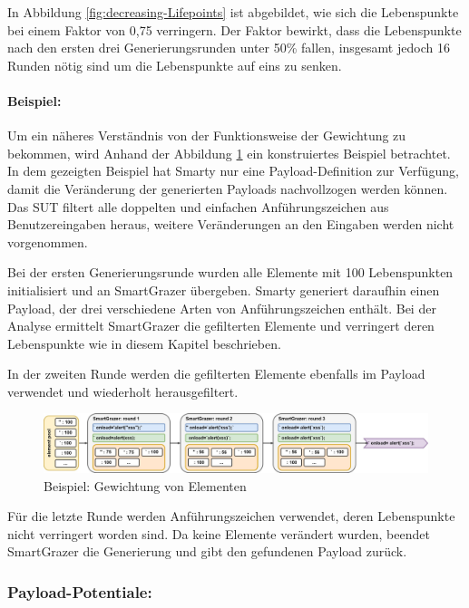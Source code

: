In Abbildung \ref{fig:decreasing-Lifepoints} ist abgebildet, wie sich die Lebenspunkte bei einem Faktor von 0,75 verringern. Der Faktor bewirkt, dass die Lebenspunkte nach den ersten drei Generierungsrunden unter 50\% fallen, insgesamt jedoch 16 Runden nötig sind um die Lebenspunkte auf eins zu senken.

\FloatBarrier

\paragraph{Beispiel:} Um ein näheres Verständnis von der Funktionsweise der Gewichtung zu bekommen, wird Anhand der Abbildung \ref{fig:SmartGrazer-adjustmentExample} ein konstruiertes Beispiel betrachtet. In dem gezeigten Beispiel hat Smarty nur eine Payload-Definition zur Verfügung, damit die Veränderung der generierten Payloads nachvollzogen werden können. Das \ac{SUT} filtert alle doppelten und einfachen Anführungszeichen aus Benutzereingaben heraus, weitere Veränderungen an den Eingaben werden nicht vorgenommen.

Bei der ersten Generierungsrunde wurden alle Elemente mit 100 Lebenspunkten initialisiert und an SmartGrazer übergeben. Smarty generiert daraufhin einen Payload, der drei verschiedene Arten von Anführungszeichen enthält. Bei der Analyse ermittelt SmartGrazer die gefilterten Elemente und verringert deren Lebenspunkte wie in diesem Kapitel beschrieben.

In der zweiten Runde werden die gefilterten Elemente ebenfalls im Payload verwendet und wiederholt herausgefiltert.

\begin{figure}[htbp] 
	\centering
	\includegraphics[width=\textwidth]{contents/images/SmartGrazerAdjustmentExample}
	\caption{Beispiel: Gewichtung von Elementen}
	\label{fig:SmartGrazer-adjustmentExample}
\end{figure}

Für die letzte Runde werden Anführungszeichen verwendet, deren Lebenspunkte nicht verringert worden sind. Da keine Elemente verändert wurden, beendet SmartGrazer die Generierung und gibt den gefundenen Payload zurück.

\FloatBarrier
\subsubsection{Payload-Potentiale:}

